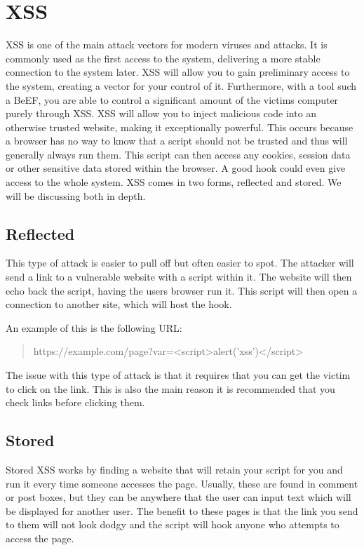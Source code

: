 \documentclass[a4paper,11pt]{report}
\begin{document}
	\section{XSS}
		XSS is one of the main attack vectors for modern viruses and attacks. 
		It is commonly used as the first access to the system, delivering a more stable connection to the system later. 
		XSS will allow you to gain preliminary access to the system, creating a vector for your control of it. 
		Furthermore, with a tool such a BeEF, you are able to control a significant amount of the victims computer purely through XSS. 
		XSS will allow you to inject malicious code into an otherwise trusted website, making it exceptionally powerful. 
		This occurs because a browser has no way to know that a script should not be trusted and thus will generally always run them. 
		This script can then access any cookies, session data or other sensitive data stored within the browser. 
		A good hook could even give access to the whole system. 
		XSS comes in two forms, reflected and stored. 
		We will be discussing both in depth. 
		\subsection{Reflected}
			This type of attack is easier to pull off but often easier to spot. 
			The attacker will send a link to a vulnerable website with a script within it. 
			The website will then echo back the script, having the users browser run it. 
			This script will then open a connection to another site, which will host the hook. 

			An example of this is the following URL:
			\begin{quote}
				https://example.com/page?var=<script>alert('xss')</script>
			\end{quote}

			The issue with this type of attack is that it requires that you can get the victim to click on the link.
			This is also the main reason it is recommended that you check links before clicking them.
		\subsection{Stored}
			Stored XSS works by finding a website that will retain your script for you and run it every time someone accesses the page. 
			Usually, these are found in comment or post boxes, but they can be anywhere that the user can input text which will be displayed for another user. 
			The benefit to these pages is that the link you send to them will not look dodgy and the script will hook anyone who attempts to access the page. 
\end{document}
